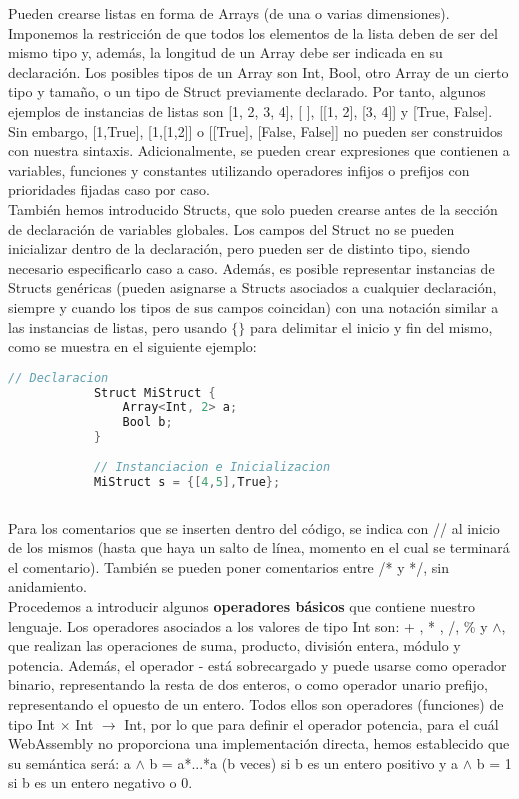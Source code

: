 \documentclass[12pt,onecolumn]{article}
\begin{document}
	 Pueden crearse listas en forma de Arrays (de una o varias dimensiones). Imponemos la restricción de que todos los elementos de la lista deben de ser del mismo tipo y, además, la longitud de un Array debe ser indicada en su declaración. Los posibles tipos de un Array son Int, Bool, otro Array de un cierto tipo y tamaño, o un tipo de Struct previamente declarado. Por tanto, algunos ejemplos de instancias de listas son [1, 2, 3, 4], [ ], [[1, 2], [3, 4]] y [True, False]. Sin embargo, [1,True], [1,[1,2]] o [[True], [False, False]] no pueden ser construidos con nuestra sintaxis. Adicionalmente, se pueden crear expresiones que contienen a variables, funciones y constantes utilizando operadores infijos o prefijos con prioridades fijadas caso por caso.  \\
	 
	 También hemos introducido Structs, que solo pueden crearse antes de la sección de declaración de variables globales. Los campos del Struct no se pueden inicializar dentro de la declaración, pero pueden ser de distinto tipo, siendo necesario especificarlo caso a caso. Además, es posible representar instancias de Structs genéricas (pueden asignarse a Structs asociados a cualquier declaración, siempre y cuando los tipos de sus campos coincidan) con una notación similar a las instancias de listas, pero usando $\{\}$ para delimitar el inicio y fin del mismo, como se muestra en el siguiente ejemplo: \smallskip
	\begin{lstlisting}[language=C++,gobble=15]
			// Declaracion
			Struct MiStruct {	
				Array<Int, 2> a;
				Bool b;
			}
			
			// Instanciacion e Inicializacion
			MiStruct s = {[4,5],True}; 
			
		\end{lstlisting}
	\smallskip
	
	Para los comentarios que se inserten dentro del código, se indica con // al inicio de los mismos (hasta que haya un salto de línea, momento en el cual se terminará el comentario). También se pueden poner comentarios entre /* y */, sin anidamiento. \\
	
	Procedemos a introducir algunos \textbf{operadores básicos} que contiene nuestro lenguaje. Los operadores asociados a los valores de tipo Int son: + , * , /, \%  y $\wedge$, que realizan las operaciones de suma, producto, división entera, módulo y potencia.  Además, el operador - está sobrecargado y puede usarse como operador binario, representando la resta de dos enteros, o como operador unario prefijo, representando el opuesto de un entero. Todos ellos son operadores (funciones) de tipo Int $\times$ Int $\longrightarrow$ Int, por lo que para definir el operador potencia, para el cuál WebAssembly no proporciona una implementación directa, hemos establecido que su semántica será: a $\wedge$ b = a*...*a (b veces) si b es un entero positivo y  a $\wedge$ b = 1 si b es un entero negativo o 0.\\
	
\end{document}
